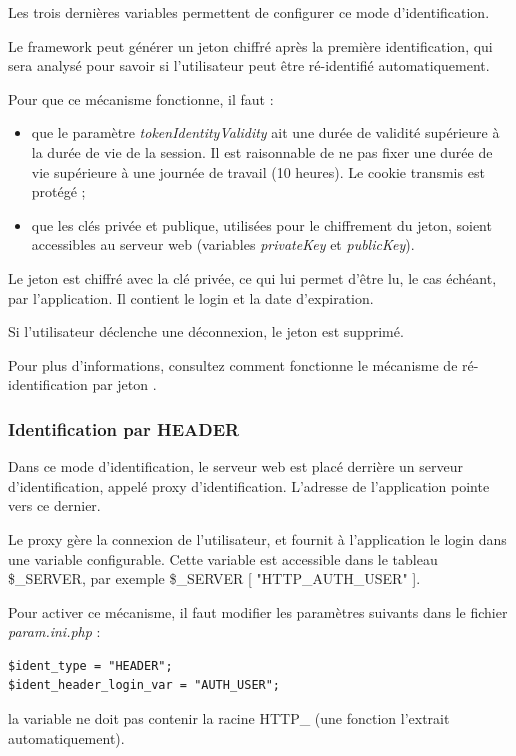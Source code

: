Les trois dernières variables permettent de configurer ce mode d'identification. 

Le framework peut générer un jeton chiffré après la première identification, qui sera analysé pour savoir si l'utilisateur peut être ré-identifié automatiquement.

Pour que ce mécanisme fonctionne, il faut :
\begin{itemize}
\item que le paramètre \textit{tokenIdentityValidity} ait une durée de validité supérieure à la durée de vie de la session. Il est raisonnable de ne pas fixer une durée de vie supérieure à une journée de travail (10 heures). Le cookie transmis est protégé ;
\item que les clés privée et publique, utilisées pour le chiffrement du jeton, soient accessibles au serveur web (variables \textit{privateKey} et \textit{publicKey}).
\end{itemize}

Le jeton est chiffré avec la clé privée, ce qui lui permet d'être lu, le cas échéant, par l'application. Il contient le login et la date d'expiration. 

Si l'utilisateur déclenche une déconnexion, le jeton est supprimé.

Pour plus d'informations, consultez comment fonctionne le mécanisme de ré-identification par jeton \cite{token}.

\subsubsection{Identification par HEADER}

Dans ce mode d'identification, le serveur web est placé derrière un serveur d'identification, appelé proxy d'identification. L'adresse de l'application pointe vers ce dernier. 

Le proxy gère la connexion de l'utilisateur, et fournit à l'application le login dans une variable configurable. Cette variable est accessible dans le tableau \$\_SERVER, par exemple \$\_SERVER [ "HTTP\_AUTH\_USER" ].

Pour activer ce mécanisme, il faut modifier les paramètres suivants dans le fichier \textit{param.ini.php} :
\begin{lstlisting}
$ident_type = "HEADER";
$ident_header_login_var = "AUTH_USER";
\end{lstlisting}

la variable ne doit pas contenir la racine HTTP\_ (une fonction l'extrait automatiquement).

